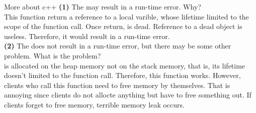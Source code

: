 %
%

\newcommand{\hmwkID}{2}
\newcommand{\hmwkTitle}{Homework\ \#\hmwkID}
\newcommand{\hmwkDueDate}{April 14, 2015 at 16:20}
\newcommand{\hmwkUniversity}{NTU}
\newcommand{\hmwkClass}{Data Structures and Algorithms}
\newcommand{\hmwkClassAlias}{DSA}
\newcommand{\hmwkClassSection}{Spring 2015}
\newcommand{\hmwkClassInstructor}{Hsuan-Tien Lin, Roger Jang}
\newcommand{\hmwkAuthorName}{Tim Liou}
\newcommand{\hmwkAuthorID}{b03902028}







\maketitle

\pagebreak

\begin{homeworkProblem}{More about c++}
    \textbf{(1)} The  may result in a run-time error. Why?
    \\

    This function return a reference to a local varible, whose lifetime limited to
    the scope of the function call. Once  return,  is dead. 
    Reference to a dead object is useless. Therefore, it would result in a run-time
    error.
    \\

    \textbf{(2)} The  does not result in a run-time error,
    but there may be some other problem. What is the problem?
    \\

     is allocated on the heap memory not on the stack memory, that is,
    its lifetime doesn't limited to the function call. Therefore, this function works.
    However, clients who call this function need to free memory by themselves. That is
    annoying since clients do not allocte anything but have to free something out. If
    clients forget to free memory, terrible memory leak occurs.
    \\
    
\end{homeworkProblem}

